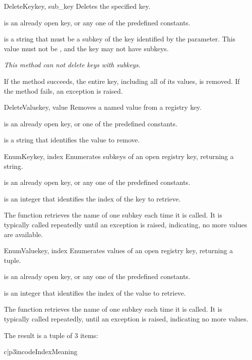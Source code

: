 \begin{funcdesc}{DeleteKey}{key, sub_key}
 Deletes the specified key.

  is an already open key, or any one of the predefined 
  constants.
 
  is a string that must be a subkey of the key 
 identified by the  parameter.  This value must not be 
 , and the key may not have subkeys.

 \emph{This method can not delete keys with subkeys.}

 If the method succeeds, the entire key, including all of its values,
 is removed.  If the method fails, an  
 exception is raised.
\end{funcdesc}


\begin{funcdesc}{DeleteValue}{key, value}
  Removes a named value from a registry key.
  
  is an already open key, or one of the predefined 
  constants.
  
  is a string that identifies the value to remove.
\end{funcdesc}


\begin{funcdesc}{EnumKey}{key, index}
  Enumerates subkeys of an open registry key, returning a string.

  is an already open key, or any one of the predefined 
  constants.

  is an integer that identifies the index of the key to 
 retrieve.

 The function retrieves the name of one subkey each time it 
 is called.  It is typically called repeatedly until an 
  exception 
 is raised, indicating, no more values are available.
\end{funcdesc}


\begin{funcdesc}{EnumValue}{key, index}
  Enumerates values of an open registry key, returning a tuple.
  
  is an already open key, or any one of the predefined 
  constants.
 
  is an integer that identifies the index of the value 
 to retrieve.
 
 The function retrieves the name of one subkey each time it is 
 called. It is typically called repeatedly, until an 
  exception is raised, indicating 
 no more values.
 
 The result is a tuple of 3 items:

 \begin{tableii}{c|p{3in}}{code}{Index}{Meaning}
 \end{tableii}

\end{funcdesc}


